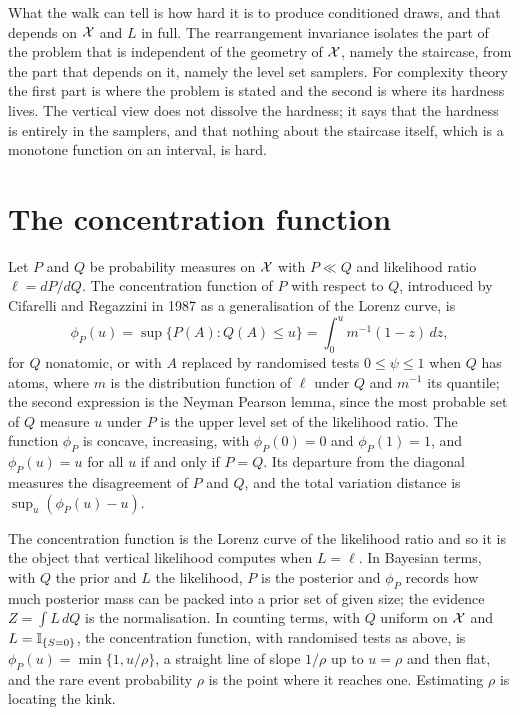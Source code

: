 What the walk can tell is how hard it is to produce conditioned draws, and that depends on $\mathcal{X}$ and $L$ in full. The rearrangement invariance isolates the part of the problem that is independent of the geometry of $\mathcal{X}$, namely the staircase, from the part that depends on it, namely the level set samplers. For complexity theory the first part is where the problem is stated and the second is where its hardness lives. The vertical view does not dissolve the hardness; it says that the hardness is entirely in the samplers, and that nothing about the staircase itself, which is a monotone function on an interval, is hard.

\section{The concentration function}

Let $P$ and $Q$ be probability measures on $\mathcal{X}$ with $P \ll Q$ and likelihood ratio $\ell = dP/dQ$. The concentration function of $P$ with respect to $Q$, introduced by Cifarelli and Regazzini in 1987 as a generalisation of the Lorenz curve, is
\[
\phi_P(u) = \sup\{ P(A) : Q(A) \le u \} = \int_0^u m^{-1}(1 - z) \, dz ,
\]
for $Q$ nonatomic, or with $A$ replaced by randomised tests $0 \le \psi \le 1$ when $Q$ has atoms, where $m$ is the distribution function of $\ell$ under $Q$ and $m^{-1}$ its quantile; the second expression is the Neyman Pearson lemma, since the most probable set of $Q$ measure $u$ under $P$ is the upper level set of the likelihood ratio. The function $\phi_P$ is concave, increasing, with $\phi_P(0) = 0$ and $\phi_P(1) = 1$, and $\phi_P(u) = u$ for all $u$ if and only if $P = Q$. Its departure from the diagonal measures the disagreement of $P$ and $Q$, and the total variation distance is $\sup_u (\phi_P(u) - u)$.

The concentration function is the Lorenz curve of the likelihood ratio and so it is the object that vertical likelihood computes when $L = \ell$. In Bayesian terms, with $Q$ the prior and $L$ the likelihood, $P$ is the posterior and $\phi_P$ records how much posterior mass can be packed into a prior set of given size; the evidence $Z = \int L \, dQ$ is the normalisation. In counting terms, with $Q$ uniform on $\mathcal{X}$ and $L = \mathbb{I}_{\{S = 0\}}$, the concentration function, with randomised tests as above, is $\phi_P(u) = \min\{1, u/\rho\}$, a straight line of slope $1/\rho$ up to $u = \rho$ and then flat, and the rare event probability $\rho$ is the point where it reaches one. Estimating $\rho$ is locating the kink.

